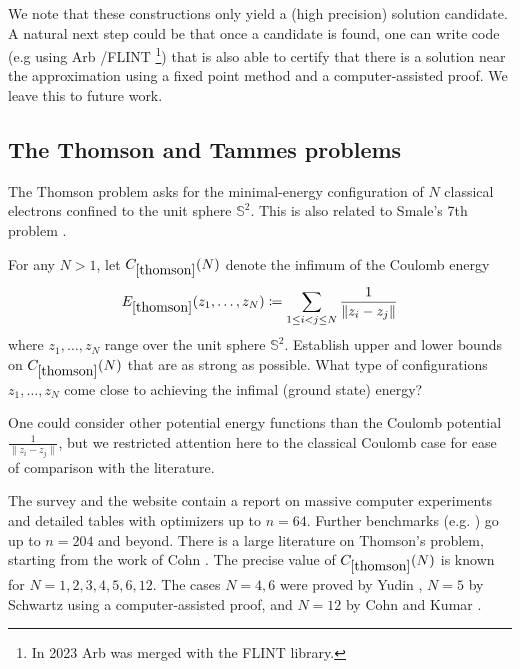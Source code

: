 We note that these constructions only yield a (high precision) solution candidate. A natural next step could be that once a candidate is found, one can write code (e.g using Arb \cite{johansson2017arb}/FLINT \cite{hart2010flint} \footnote{In 2023 Arb was merged with the FLINT library.}) that is also able to certify that there is a solution near the approximation using a fixed point method and a computer-assisted proof. 
We leave this to future work.




\subsection{The Thomson and Tammes problems} \label{subsec:thomson}

The Thomson problem \cite[p. 255]{thomson} asks for
the minimal-energy configuration of $N$ classical electrons confined to the unit sphere $\mathbb{S}^2$. This is also related to Smale's 7th problem \cite{smale1998mathematical}. 

\renewcommand{\problemURL}{https://google-deepmind.github.io/alphaevolve_repository_of_problems/problems/33.html}

\begin{problem}\label{thomson} For any $N>1$, let $C_{\ref{thomson}}(N)$ denote the infimum of the Coulomb energy
\begin{align*}
E_{\ref{thomson}}(z_1,\ldots,z_N) \coloneqq \sum_{1 \leq i < j \leq N} \frac{1}{\|z_i - z_j\|}    
\end{align*}
where $z_1, \dots, z_N$ range over the unit sphere $\mathbb{S}^2$.  Establish upper and lower bounds on $C_{\ref{thomson}}(N)$ that are as strong as possible.  What type of configurations $z_1,\dots,z_N$ come close to achieving the infimal (ground state) energy?
\end{problem}

One could consider other potential energy functions than the Coulomb potential $\frac{1}{\|z_i-z_j\|}$, but we restricted attention here to the classical Coulomb case for ease of comparison with the literature.

The survey \cite{balingeretal} and the website \cite{BBCGKS2006} contain a report on massive computer experiments and detailed tables with optimizers up to $n=64$. Further benchmarks (e.g. \cite{Hars2025}) go up to $n=204$ and beyond.
There is a large literature on Thomson’s problem, starting from the work of Cohn \cite{Cohn1956}. The precise value of $C_{\ref{thomson}}(N)$ is known for $N=1,2,3,4,5,6,12$. The cases $N = 4,6$ were proved by Yudin \cite{yudin1992}, $N = 5$ by Schwartz \cite{schwartz2013} using a computer-assisted proof, and $N = 12$ by Cohn and Kumar \cite{cohn2007}.

